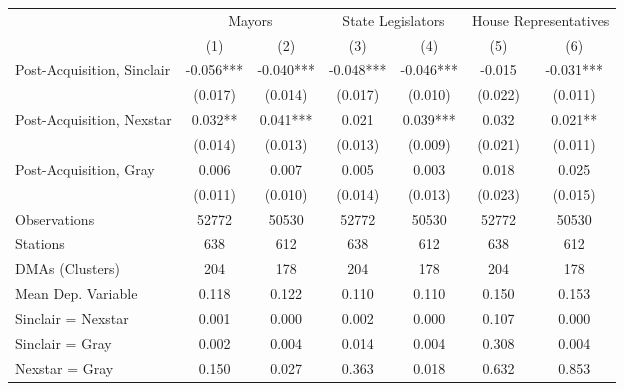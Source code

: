 {
\def\sym#1{\ifmmode^{#1}\else\(^{#1}\)\fi}
\begin{tabular}{l*{6}{c}}
\toprule
                &\multicolumn{2}{c}{Mayors}&\multicolumn{2}{c}{State Legislators}&\multicolumn{2}{c}{House Representatives}\\\cmidrule(lr){2-3}\cmidrule(lr){4-5}\cmidrule(lr){6-7}
                &\multicolumn{1}{c}{(1)}   &\multicolumn{1}{c}{(2)}   &\multicolumn{1}{c}{(3)}   &\multicolumn{1}{c}{(4)}   &\multicolumn{1}{c}{(5)}   &\multicolumn{1}{c}{(6)}   \\
\midrule
Post-Acquisition, Sinclair&   -0.056***&   -0.040***&   -0.048***&   -0.046***&   -0.015   &   -0.031***\\
                &  (0.017)   &  (0.014)   &  (0.017)   &  (0.010)   &  (0.022)   &  (0.011)   \\
Post-Acquisition, Nexstar&    0.032** &    0.041***&    0.021   &    0.039***&    0.032   &    0.021** \\
                &  (0.014)   &  (0.013)   &  (0.013)   &  (0.009)   &  (0.021)   &  (0.011)   \\
Post-Acquisition, Gray&    0.006   &    0.007   &    0.005   &    0.003   &    0.018   &    0.025   \\
                &  (0.011)   &  (0.010)   &  (0.014)   &  (0.013)   &  (0.023)   &  (0.015)   \\
\midrule
Observations    &    52772   &    50530   &    52772   &    50530   &    52772   &    50530   \\
Stations        &      638   &      612   &      638   &      612   &      638   &      612   \\
DMAs (Clusters) &      204   &      178   &      204   &      178   &      204   &      178   \\
Mean Dep. Variable&    0.118   &    0.122   &    0.110   &    0.110   &    0.150   &    0.153   \\
\midrule Sinclair = Nexstar&    0.001   &    0.000   &    0.002   &    0.000   &    0.107   &    0.000   \\
Sinclair = Gray &    0.002   &    0.004   &    0.014   &    0.004   &    0.308   &    0.004   \\
Nexstar = Gray  &    0.150   &    0.027   &    0.363   &    0.018   &    0.632   &    0.853   \\
\bottomrule
\end{tabular}
}

